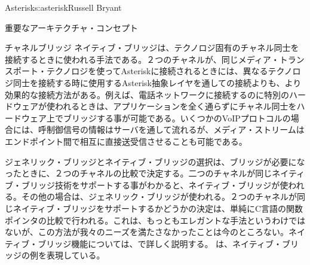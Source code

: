 \begin{aosachapter}{Asterisk}{s:asterisk}{Russell Bryant}
\begin{aosasect1}{重要なアーキテクチャ・コンセプト}
\begin{aosasect2}{チャネルブリッジ}
ネイティブ・ブリッジは、テクノロジ固有のチャネル同士を接続するときに使われる手法である。２つのチャネルが、同じメディア・トランスポート・テクノロジを使ってAsteriskに接続されるときには、異なるテクノロジ同士を接続する時に使用するAsterisk抽象レイヤを通しての接続よりも、より効果的な接続方法がある。例えば、電話ネットワークに接続するのに特別のハードウェアが使われるときは、アプリケーションを全く通らずにチャネル同士をハードウェア上でブリッジする事が可能である。いくつかのVoIPプロトコルの場合には、呼制御信号の情報はサーバを通して流れるが、メディア・ストリームはエンドポイント間で相互に直接送受信させることも可能である。

ジェネリック・ブリッジとネイティブ・ブリッジの選択は、ブリッジが必要になったときに、２つのチャネルの比較で決定する。二つのチャネルが同じネイティブ・ブリッジ技術をサポートする事がわかると、ネイティブ・ブリッジが使われる。その他の場合は、ジェネリック・ブリッジが使われる。２つのチャネルが同じネイティブ・ブリッジをサポートするかどうかの決定は、単純にC言語の関数ポインタの比較で行われる。これは、もっともエレガントな手法というわけではないが、この方法が我々のニーズを満たさなかったことは今のところない。ネイティブ・ブリッジ機能については、で詳しく説明する。
は、ネイティブ・ブリッジの例を表現している。


\end{aosasect2}
\end{aosasect1}
\end{aosachapter}
